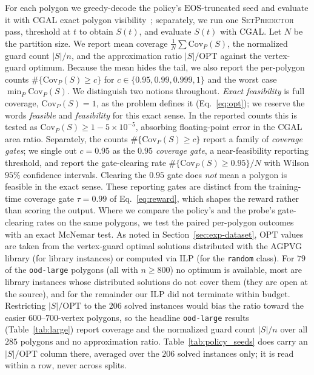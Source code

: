 \documentclass[11pt]{article}
\newcommand{\Covf}[1]{\mathrm{Cov}_P(#1)}
\newcommand{\EOS}{\mathrm{EOS}}
\newcommand{\OPT}{\mathrm{OPT}}
\newcommand{\SetPredictor}{\textup{\textsc{SetPredictor}}}
\newcommand{\cfeas}{0.95} %
\begin{document}
For each polygon we greedy-decode the policy's $\EOS$-truncated seed and evaluate it with CGAL exact polygon visibility~\cite{cgal:eb-25b}; separately, we run one \SetPredictor{} pass, threshold at $t$ to obtain $S(t)$, and evaluate $S(t)$ with CGAL. Let $N$ be the partition size. We report mean coverage $\frac{1}{N}\sum \Covf{S}$, the normalized guard count $|S|/n$, and the approximation ratio $|S|/\OPT$ against the vertex-guard optimum. Because the mean hides the tail, we also report the per-polygon counts $\#\{\Covf{S} \geq c\}$ for $c \in \{0.95, 0.99, 0.999, 1\}$ and the worst case $\min_P \Covf{S}$. We distinguish two notions throughout. \emph{Exact feasibility} is full coverage, $\Covf{S} = 1$, as the problem defines it (Eq.~\eqref{eq:opt}); we reserve the words \emph{feasible} and \emph{feasibility} for this exact sense. In the reported counts this is tested as $\Covf{S} \geq 1 - 5 \times 10^{-5}$, absorbing floating-point error in the CGAL area ratio. Separately, the counts $\#\{\Covf{S} \geq c\}$ report a family of \emph{coverage gates}; we single out $c = \cfeas$ as the \emph{$0.95$ coverage gate}, a near-feasibility reporting threshold, and report the gate-clearing rate $\#\{\Covf{S} \geq \cfeas\}/N$ with Wilson $95\%$ confidence intervals. Clearing the $0.95$ gate does \emph{not} mean a polygon is feasible in the exact sense. These reporting gates are distinct from the training-time coverage gate $\tau = 0.99$ of Eq.~\eqref{eq:reward}, which shapes the reward rather than scoring the output. Where we compare the policy's and the probe's gate-clearing rates on the same polygons, we test the paired per-polygon outcomes with an exact McNemar test. As noted in Section~\ref{sec:exp-dataset}, $\OPT$ values are taken from the vertex-guard optimal solutions distributed with the AGPVG library (for library instances) or computed via ILP (for the \texttt{random} class). For $79$ of the \texttt{ood-large} polygons (all with $n \geq 800$) no optimum is available, most are library instances whose distributed solutions do not cover them (they are open at the source), and for the remainder our ILP did not terminate within budget. Restricting $|S|/\OPT$ to the $206$ solved instances would bias the ratio toward the easier $600$--$700$-vertex polygons, so the headline \texttt{ood-large} results (Table~\ref{tab:large}) report coverage and the normalized guard count $|S|/n$ over all $285$ polygons and no approximation ratio. Table~\ref{tab:policy_seeds} does carry an $|S|/\OPT$ column there, averaged over the $206$ solved instances only; it is read within a row, never across splits.
\end{document}
